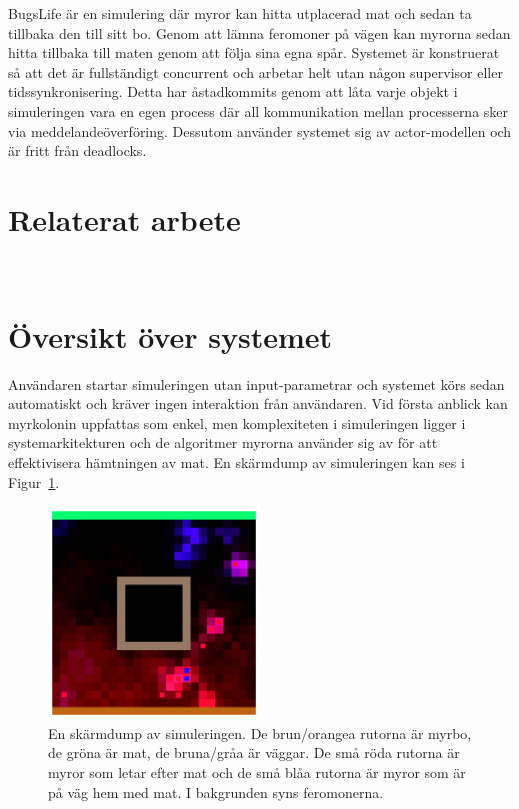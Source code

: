 \documentclass[12pt]{article}
\begin{document}
BugsLife är en simulering där myror kan hitta utplacerad mat och sedan ta tillbaka den till sitt bo.
Genom att lämna feromoner på vägen kan myrorna sedan hitta tillbaka till maten genom att följa sina egna spår.
Systemet är konstruerat så att det är fullständigt concurrent och arbetar helt utan någon supervisor eller tidssynkronisering.
Detta har åstadkommits genom att låta varje objekt i simuleringen vara en egen process där all kommunikation mellan processerna sker via meddelandeöverföring.
Dessutom använder systemet sig av actor-modellen och är fritt från deadlocks.

\section{Relaterat arbete}
~\cite{dorigo1997ant}

\section{Översikt över systemet}
Användaren startar simuleringen utan input-parametrar och systemet körs sedan automatiskt och kräver ingen interaktion från användaren.
Vid första anblick kan myrkolonin uppfattas som enkel,
men komplexiteten i simuleringen ligger i systemarkitekturen och de algoritmer myrorna använder sig av för att effektivisera hämtningen av mat.
En skärmdump av simuleringen kan ses i Figur~\ref{fig:screen-dump}.

\begin{figure}[H]
    \centering
    \includegraphics[width=0.5\textwidth]{BugsLife-Fig1.png}
    \caption{
        En skärmdump av simuleringen.
        De brun/orangea rutorna är myrbo,
        de gröna är mat,
        de bruna/gråa är väggar.
        De små röda rutorna är myror som letar efter mat och de små blåa rutorna är myror som är på väg hem med mat.
        I bakgrunden syns feromonerna.
    }\label{fig:screen-dump}
\end{figure}
\end{document}
